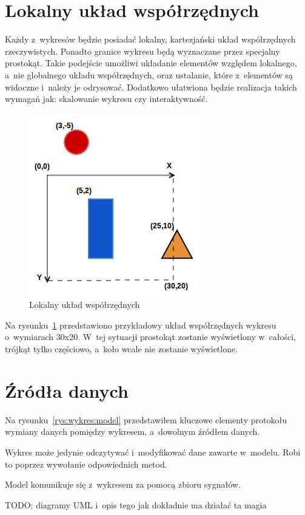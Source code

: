 \section{Lokalny układ współrzędnych}
Każdy z~wykresów będzie posiadać lokalny, kartezjański układ współrzędnych rzeczywistych. Ponadto granice wykresu będą wyznaczane przez specjalny prostokąt. Takie podejście umożliwi układanie elementów względem lokalnego, a~nie globalnego układu współrzędnych, oraz ustalanie, które z~elementów są widoczne i~należy je odrysować. Dodatkowo ułatwiona będzie realizacja takich wymagań jak: skalowanie wykresu czy interaktywność. 

\begin{figure}
\centering
\caption{Lokalny układ współrzędnych}\label{rys:uklad:wspolrzednych}
\includegraphics{img/uklad_wspolrzednych.png}
\end{figure}

Na rysunku~\ref{rys:uklad:wspolrzednych} przedstawiono przykładowy układ współrzędnych wykresu o~wymiarach 30x20. W~tej sytuacji prostokąt zostanie wyświetlony w~całości, trójkąt tylko częściowo, a~koło wcale nie zostanie wyświetlone.

\section{Źródła danych}
Na rysunku~\ref{rys:wykres:model} przedstawiłem kluczowe elementy protokołu wymiany danych pomiędzy wykresem, a~dowolnym źródłem danych. 

Wykres może jedynie odczytywać i~modyfikować dane zawarte w~modelu. Robi to poprzez wywołanie odpowiednich metod.

Model komunikuje się z~wykresem za pomocą zbioru sygnałów.

TODO: diagramy UML i~opis tego jak dokładnie ma działać ta magia

